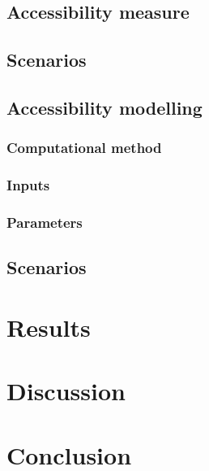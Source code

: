 \documentclass[12pt, a4paper]{report}
\begin{document}



\section{Accessibility measure}

\section{Scenarios}

\section{Accessibility modelling}


\subsection{Computational method}

\subsection{Inputs}

\subsection{Parameters}


\section{Scenarios}

\chapter{Results} \label{Chap5}
\chapter{Discussion} \label{Chap6}
\chapter{Conclusion} \label{Chap7}
\end{document}
